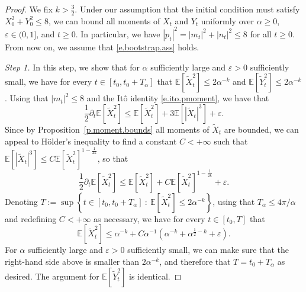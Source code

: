 \documentclass[11pt]{amsart}
\theoremstyle{remark}
\theoremstyle{definition}
\numberwithin{equation}{section}
\numberwithin{proposition}{section}
\newcommand{\ep}{\varepsilon}
\newcommand{\eps}{\varepsilon}
\renewcommand{\le}{\leqslant}
\renewcommand{\ge}{\geqslant}
\newcommand{\td}{\widetilde}
\newcommand{\Ll}{\left}
\newcommand{\Rr}{\right}
\newcommand{\dr}{\partial}
\newcommand{\1}{\mathbf{1}}
\newcommand{\al}{\alpha}
\newcommand{\E}{\mathbb E}
\begin{document}
\begin{proof}
We fix $k > \frac 3 2$. Under our assumption that the initial condition must satisfy $X_0^2 + Y_0^2 \le 8$, we can bound all moments of $X_t$ and $Y_t$ uniformly over $\alpha \ge 0$, $\ep \in (0,1]$, and $t \ge 0$. In particular, we have $|p_t|^2 = |m_t|^2 + |n_t|^2 \le 8$ for all $t \ge 0$. From now on, we assume that \eqref{e.bootstrap.ass} holds. 

\medskip

\noindent \emph{Step 1.} In this step, we show that for $\alpha$ sufficiently large and $\eps > 0$ sufficiently small, we have for every $t \in [t_0, t_0 + T_\al]$ that $\E[\td X_t^2] \le 2\al^{-k}$ and $\E[\td Y_t^2] \le 2\al^{-k}$. Using that $|m_t|^2 \le 8$ and the It\^o identity \eqref{e.ito.pmoment}, we have that
\begin{equation*}  %
\frac 1 2 \dr_t \E[\td X_t^2] \le  \E[\td X_t^2] + 3 \E[|\td X_t|^3] + \ep.
\end{equation*}
Since by Proposition~\ref{p.moment.bounds} all moments of $\td X_t$ are bounded, we can appeal to H\"older's inequality to find a constant $C < +\infty$ such that $\E[|\td X_t|^3] \le C \E[\td X_t^2]^{1- \frac 1 {2k}}$, so that
\begin{equation}  
\label{e.drX2.crude.bound}
\frac 1 2 \dr_t \E[\td X_t^2] \le  \E[\td X_t^2] + C \E[\td X_t^2]^{1-\frac 1 {2k}} + \ep.
\end{equation}
Denoting $T := \sup \Ll\{ t \in [t_0, t_0 + T_\al] \ : \  \E[\td X_t^2] \le 2 \al^{-k} \Rr\}$, using that $T_\al \le 4\pi/\al$ and redefining $C < +\infty$ as necessary, we have for every $t \in [t_0, T]$ that 
\begin{equation*}  %
\E[\td X_t^2] \le \al^{-k} + C \al^{-1} \Ll( \al^{-k} + \al^{\frac 1 2 - k} + \ep \Rr)  .
\end{equation*}
For $\alpha$ sufficiently large and $\ep > 0$ sufficiently small, we can make sure that the right-hand side above is smaller than $2\al^{-k}$, and therefore that $T = t_0 + T_\alpha$ as desired. The argument for $\E[\td Y_t^2]$ is identical. 

\medskip


\end{proof}
\end{document}
